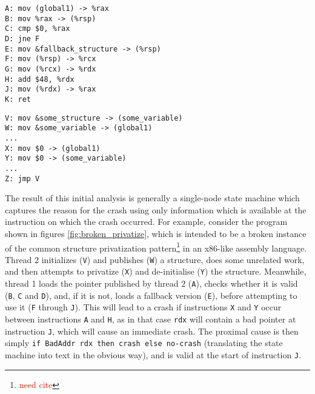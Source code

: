 \documentclass[10pt,twocolumn,preprint,natbib,authoryear]{sigplanconf}
\makeatletter
\newcommand{\editorial}[1]{\textcolor{red}{\footnote{\textcolor{red}{#1}}}}
\newcommand{\needCite}{\editorial{need cite}}
\newenvironment{subfloat}%
    {\def\caption##1{\gdef\subcapsave{\relax##1}}%
     \let\subcapsave=\@empty %
     \let\sf@oldlabel=\label
     \def\label##1{\xdef\sublabsave{\noexpand\label{##1}}}%
     \let\sublabsave\relax    %
     \setbox\subfigbox\hbox
       \bgroup}%
      {\egroup                %
     \let\label=\sf@oldlabel
     \subfigure[\subcapsave]{\box\subfigbox}}%
\makeatother
\begin{document}
\begin{figure*}
 \begin{subfloat}
  \begin{minipage}{90mm}
\begin{verbatim}
A: mov (global1) -> %rax
B: mov %rax -> (%rsp)
C: cmp $0, %rax
D: jne F
E: mov &fallback_structure -> (%rsp)
F: mov (%rsp) -> %rcx
G: mov (%rcx) -> %rdx
H: add $48, %rdx
J: mov (%rdx) -> %rax
K: ret
\end{verbatim}
  \end{minipage}
  \caption{Thread 1}
 \end{subfloat}
 \begin{subfloat}
  \begin{minipage}{90mm}
\begin{verbatim}
V: mov &some_structure -> (some_variable)
W: mov &some_variable -> (global1)
...
X: mov $0 -> (global1)
Y: mov $0 -> (some_variable)
...
Z: jmp V
\end{verbatim}
  \end{minipage}
  \caption{Thread 2}
 \end{subfloat}
 \caption{A broken example of the privatize synchronization pattern.}
 \label{fig:broken_privatize}
\end{figure*}

The result of this initial analysis is generally a single-node state
machine which captures the reason for the crash using only information
which is available at the instruction on which the crash occurred.
For example, consider the program shown in figures
\ref{fig:broken_privatize}, which is intended to be a broken instance
of the common structure privatization pattern\needCite{} in an
x86-like assembly language.  Thread 2 initializes (\verb|V|) and
publishes (\verb|W|) a structure, does some unrelated work, and then
attempts to privatize (\verb|X|) and de-initialise (\verb|Y|) the
structure.  Meanwhile, thread 1 loads the pointer published by thread
2 (\verb|A|), checks whether it is valid (\verb|B|, \verb|C| and
\verb|D|), and, if it is not, loads a fallback version (\verb|E|),
before attempting to use it (\verb|F| through \verb|J|).  This will
lead to a crash if instructions \verb|X| and \verb|Y| occur between
instructions \verb|A| and \verb|H|, as in that case \verb|rdx| will
contain a bad pointer at instruction \verb|J|, which will cause an
immediate crash.  The proximal cause is then simply
\verb|if BadAddr rdx then crash else no-crash| (translating the
state machine into text in the obvious way), and is valid at the start
of instruction \verb|J|.
\end{document}
